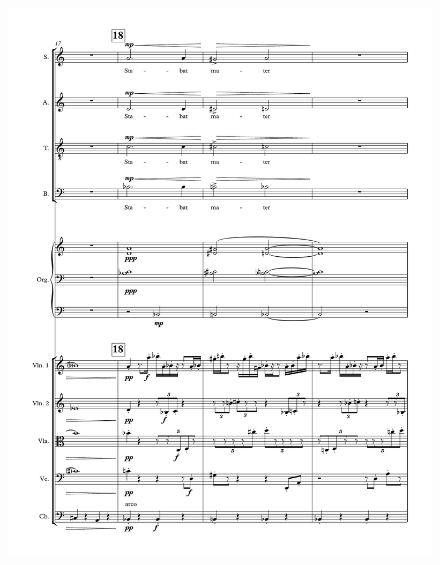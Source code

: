 \begin{figure}[htbp]
    \centering
	\includegraphics[width=6.5in]{figures/Stabat_Mater_3.pdf}
\end{figure}

